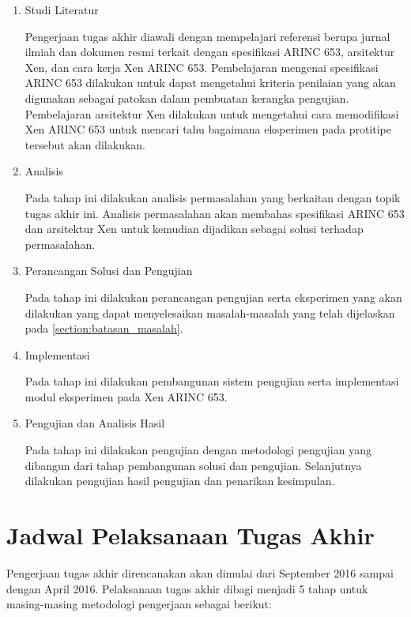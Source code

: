 \begin{enumerate}
    \item Studi Literatur

        Pengerjaan tugas akhir diawali dengan mempelajari referensi berupa jurnal ilmiah dan dokumen resmi terkait dengan spesifikasi ARINC 653, arsitektur Xen, dan cara kerja Xen ARINC 653.
        Pembelajaran mengenai spesifikasi ARINC 653 dilakukan untuk dapat mengetahui kriteria penilaian yang akan digunakan sebagai patokan dalam pembuatan kerangka pengujian.
        Pembelajaran arsitektur Xen dilakukan untuk mengetahui cara memodifikasi Xen ARINC 653 untuk mencari tahu bagaimana eksperimen pada protitipe tersebut akan dilakukan.

    \item Analisis

        Pada tahap ini dilakukan analisis permasalahan yang berkaitan dengan topik tugas akhir ini.
        Analisis permasalahan akan membahas spesifikasi ARINC 653 dan arsitektur Xen untuk kemudian dijadikan sebagai solusi terhadap permasalahan.

    \item Perancangan Solusi dan Pengujian

        Pada tahap ini dilakukan perancangan pengujian serta eksperimen yang akan dilakukan yang dapat menyelesaikan masalah\hyp{}masalah yang telah dijelaskan pada \autoref{section:batasan_masalah}.

    \item Implementasi

        Pada tahap ini dilakukan pembangunan sistem pengujian serta implementasi modul eksperimen pada Xen ARINC 653.

    \item Pengujian dan Analisis Hasil

        Pada tahap ini dilakukan pengujian dengan metodologi pengujian yang dibangun dari tahap pembangunan solusi dan pengujian.
        Selanjutnya dilakukan pengujian hasil pengujian dan penarikan kesimpulan.
\end{enumerate}

\section{Jadwal Pelaksanaan Tugas Akhir}

Pengerjaan tugas akhir direncanakan akan dimulai dari September 2016 sampai dengan April 2016.
Pelaksanaan tugas akhir dibagi menjadi 5 tahap untuk masing-masing metodologi pengerjaan sebagai berikut:

